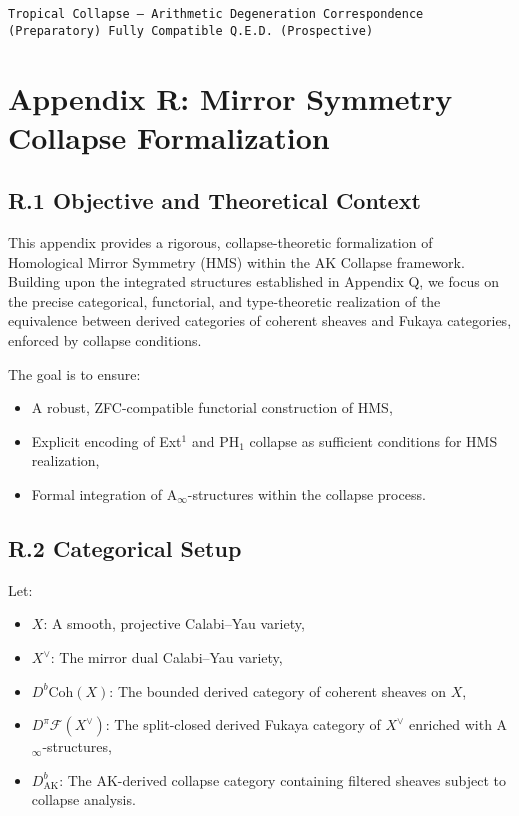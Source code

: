 \documentclass[11pt]{article}
\begin{document}
\begin{flushright}
\texttt{Tropical Collapse --- Arithmetic Degeneration Correspondence (Preparatory) \quad Fully Compatible \quad Q.E.D. (Prospective)}
\end{flushright}




\section*{Appendix R: Mirror Symmetry Collapse Formalization}

\subsection*{R.1 Objective and Theoretical Context}

This appendix provides a rigorous, collapse-theoretic formalization of Homological Mirror Symmetry (HMS) within the AK Collapse framework. Building upon the integrated structures established in Appendix Q, we focus on the precise categorical, functorial, and type-theoretic realization of the equivalence between derived categories of coherent sheaves and Fukaya categories, enforced by collapse conditions.

The goal is to ensure:
\begin{itemize}
  \item A robust, ZFC-compatible functorial construction of HMS,
  \item Explicit encoding of Ext$^1$ and PH$_1$ collapse as sufficient conditions for HMS realization,
  \item Formal integration of A$_\infty$-structures within the collapse process.
\end{itemize}

\subsection*{R.2 Categorical Setup}

Let:
\begin{itemize}
  \item $X$: A smooth, projective Calabi–Yau variety,
  \item $X^\vee$: The mirror dual Calabi–Yau variety,
  \item $D^b\mathrm{Coh}(X)$: The bounded derived category of coherent sheaves on $X$,
  \item $D^\pi\mathcal{F}(X^\vee)$: The split-closed derived Fukaya category of $X^\vee$ enriched with A$_\infty$-structures,
  \item $D^b_{\mathrm{AK}}$: The AK-derived collapse category containing filtered sheaves subject to collapse analysis.
\end{itemize}
\end{document}
